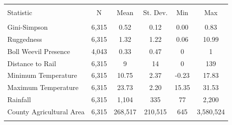 
\begin{tabular}{@{\extracolsep{5pt}}lccccc} 
\\[-1.8ex]\hline 
\hline \\[-1.8ex] 
Statistic & \multicolumn{1}{c}{N} & \multicolumn{1}{c}{Mean} & \multicolumn{1}{c}{St. Dev.} & \multicolumn{1}{c}{Min} & \multicolumn{1}{c}{Max} \\ 
\hline \\[-1.8ex] 
  Gini-Simpson & 6,315 & 0.52 & 0.12 & 0.00 & 0.83 \\
  Ruggedness & 6,315 & 1.32 & 1.22 & 0.06 & 10.99 \\
  Boll Weevil Presence & 4,043 & 0.33 & 0.47 & 0 & 1 \\
  Distance to Rail & 6,315 & 9 & 14 & 0 & 139 \\
  Minimum Temperature & 6,315 & 10.75 & 2.37 & -0.23 & 17.83 \\
  Maximum Temperature & 6,315 & 23.73 & 2.20 & 15.35 & 31.53 \\
  Rainfall & 6,315 & 1,104 & 335 & 77 & 2,200 \\
  County Agricultural Area & 6,315 & 268,517 & 210,515 & 645 & 3,580,524 \\
\hline \\[-1.8ex] 
\end{tabular} 

